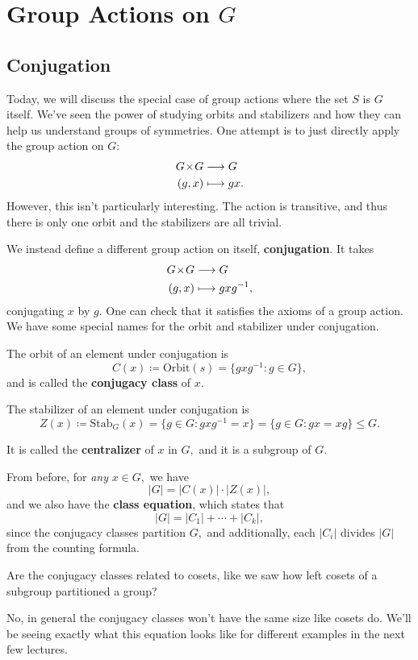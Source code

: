 
\section{Group Actions on $G$}
\subsection{Conjugation}
Today, we will discuss the special case of group actions where the set $S$ is $G$ itself. 
We've seen the power of studying orbits and stabilizers and how they can help us understand groups of symmetries. 
One attempt is to just directly apply the group action on $G$:
\begin{align*}
    G \hspace{0.05em}{\times}\hspace{0.05em} G &\longrightarrow G \\
    (g, x) &\longmapsto gx.
\end{align*}
However, this isn't particularly interesting. The action is transitive, and thus there is only one orbit and the stabilizers are all trivial. 

We instead define a different group action on itself, \textbf{conjugation}. It takes 
\begin{align*}
    G \hspace{0.05em}{\times}\hspace{0.05em} G &\longrightarrow G \\
    (g, x) &\longmapsto gxg^{-1},
\end{align*}
conjugating $x$ by $g.$ 
One can check that it satisfies the axioms of a group action. %
We have some special names for the orbit and stabilizer under conjugation.
\begin{definition}
The orbit of an element under conjugation is 
\[C(x) \coloneqq \text{Orbit}(s) = \{gxg^{-1}: g \in G\},\]
and is called the \textbf{conjugacy class} of $x.$
\end{definition}

\begin{definition}
The stabilizer of an element under conjugation is 
\[
Z(x) \coloneqq \text{Stab}_G(x) = \{g \in G: gxg^{-1}=x\} = \{g \in G: gx = xg\} \leq G.
\]

It is called the \textbf{centralizer} of $x$ in $G,$ and it is a subgroup of $G.$ 
\end{definition}

From before, for \emph{any} $x \in G,$
 we have 
 \[
 |G| = |C(x)| \cdot |Z(x)|,
 \]
 and we also have the \textbf{class equation}, which states that 
 \[
 |G| = |C_1| + \cdots + |C_k|,
 \]
 since the conjugacy classes partition $G,$ and additionally, each $|C_i|$ divides $|G|$ from the counting formula.
 \begin{question}
    Are the conjugacy classes related to cosets, like we saw how left cosets of a subgroup partitioned a group?
 \end{question}
 \begin{ans}
    No, in general the conjugacy classes won't have the same size like cosets do. 
    We'll be seeing exactly what this equation looks like for different examples in the next few lectures. 
 \end{ans}
 
